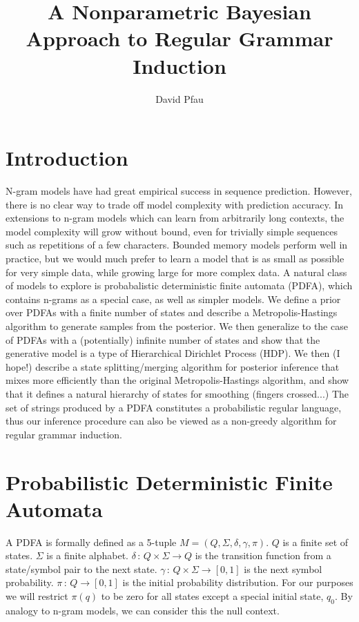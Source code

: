 \documentclass[11pt]{article}
\title{A Nonparametric Bayesian Approach to Regular Grammar Induction}
\author{David Pfau}
\begin{document}
\maketitle
\section{Introduction}
N-gram models have had great empirical success in sequence prediction.  However, there is no clear way to trade off model complexity with prediction accuracy.  In extensions to n-gram models which can learn from arbitrarily long contexts, the model complexity will grow without bound, even for trivially simple sequences such as repetitions of a few characters.  Bounded memory models perform well in practice, but we would much prefer to learn a model that is as small as possible for very simple data, while growing large for more complex data.  A natural class of models to explore is probabalistic deterministic finite automata (PDFA), which contains n-grams as a special case, as well as simpler models.  We define a prior over PDFAs with a finite number of states and describe a Metropolis-Hastings algorithm to generate samples from the posterior.  We then generalize to the case of PDFAs with a (potentially) infinite number of states and show that the generative model is a type of Hierarchical Dirichlet Process (HDP).  We then (I hope!) describe a state splitting/merging algorithm for posterior inference that mixes more efficiently than the original Metropolis-Hastings algorithm, and show that it defines a natural hierarchy of states for smoothing (fingers crossed...)  The set of strings produced by a PDFA constitutes a probabilistic regular language, thus our inference procedure can also be viewed as a non-greedy algorithm for regular grammar induction.

\section{Probabilistic Deterministic Finite Automata}
A PDFA is formally defined as a 5-tuple $M = (Q,\Sigma,\delta,\gamma,\pi)$.  $Q$ is a finite set of states. $\Sigma$ is a finite alphabet. $\delta\,:\,Q\times\Sigma\rightarrow Q$ is the transition function from a state/symbol pair to the next state.  $\gamma\,:\,Q\times\Sigma\rightarrow[0,1]$ is the next symbol probability.  $\pi\,:\,Q\rightarrow[0,1]$ is the initial probability distribution.  For our purposes we will restrict $\pi(q)$ to be zero for all states except a special initial state, $q_0$.  By analogy to n-gram models, we can consider this the null context.  
\end{document}
